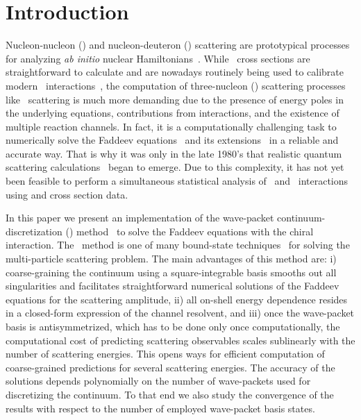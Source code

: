\documentclass[aps,prc,showpacs,twocolumn,floatfix,nobibnotes,nofootinbib,amsmath,amssymb,longbibliography]{revtex4-2}
\begin{document}
\section{Introduction}
Nucleon-nucleon (\NN) and nucleon-deuteron (\Nd) scattering are
prototypical processes for analyzing \textit{ab initio} nuclear
Hamiltonians~\cite {Glockle:aYZcaRsU,Gloeckle:1995jg}. While \NN~cross
sections are straightforward to calculate and are nowadays routinely
being used to calibrate modern
\NN~interactions~\cite{Carlsson:2015vda,Reinert:2017usi,Piarulli:2014bda,Entem:2017gor},
the computation of three-nucleon (\NNN) scattering processes like
\Nd~scattering is much more demanding due to the presence of energy
poles in the underlying equations, contributions from \NNN
interactions, and the existence of multiple reaction channels. In
fact, it is a computationally challenging task to numerically solve
the Faddeev equations~\cite{Faddeev:1960su} and its
extensions~\cite{Weinberg:1964zza,Rosenberg:1965zz,Yakubovsky:1966ue,Alt:1967fx,Grassberger:1967zz}
in a reliable and accurate way. That is why it was only in the late
1980's that realistic quantum scattering
calculations~\cite{Witala:1988ty} began to emerge. Due to this
complexity, it has not yet been feasible to perform a simultaneous
statistical analysis of \NN~and \NNN~interactions using \Nd{} and
\NN{} cross section data.

In this paper we present an implementation of the wave-packet
continuum-discretization (\wpcd) method~\cite{Rubtsova:2015owa} to
solve the Faddeev equations with the chiral
\NNLOopt~\cite{Ekstrom:2013kea} interaction. The \wpcd~method is one
of many bound-state techniques~\cite {Carbonell:2013ywa} for solving
the multi-particle scattering problem. The main advantages of this
method are: i) coarse-graining the continuum using a square-integrable
basis smooths out all singularities and facilitates straightforward
numerical solutions of the Faddeev equations for the scattering
amplitude, ii) all on-shell energy dependence resides in a closed-form
expression of the channel resolvent, and iii) once the wave-packet
basis is antisymmetrized, which has to be done only once computationally, the
computational cost of predicting scattering observables scales sublinearly
with the number of scattering energies. This opens ways for efficient
computation of coarse-grained \Nd{} predictions for several scattering
energies. The accuracy of the solutions depends polynomially on the
number of wave-packets used for discretizing the continuum. To that
end we also study the convergence of the \wpcd{} results with respect
to the number of employed wave-packet basis states.
\end{document}
